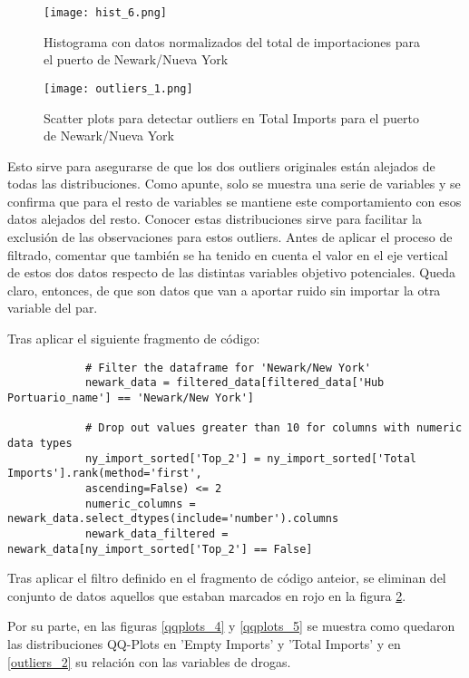 \documentclass[12pt]{article}
\begin{document}
		\begin{figure}[H]
			\caption{\label{hist_6} Histograma con datos normalizados del total de importaciones para el puerto de Newark/Nueva York}
			\centering
			\hspace*{1cm}
			\texttt{[image: hist\_6.png]}
		\end{figure}
		
		
		
		\begin{figure}[H]
			\caption{\label{outliers_1} Scatter plots para detectar outliers en Total Imports para el puerto de Newark/Nueva York}
			\centering
			\hspace*{1cm}
			\texttt{[image: outliers\_1.png]}
		\end{figure}
	
		Esto sirve para asegurarse de que los dos outliers originales están alejados de todas las distribuciones. Como apunte, solo se muestra una serie de variables y se confirma que para el resto de variables se mantiene este comportamiento con esos datos alejados del resto. Conocer estas distribuciones sirve para facilitar la exclusión de las observaciones para estos outliers. Antes de aplicar el proceso de filtrado, comentar que también se ha tenido en cuenta el valor en el eje vertical de estos dos datos respecto de las distintas variables objetivo potenciales. Queda claro, entonces, de que son datos que van a aportar ruido sin importar la otra variable del par.
		
		Tras aplicar el siguiente fragmento de código:
		
		\begin{verbatim}
			# Filter the dataframe for 'Newark/New York'
			newark_data = filtered_data[filtered_data['Hub Portuario_name'] == 'Newark/New York']
			
			# Drop out values greater than 10 for columns with numeric data types
			ny_import_sorted['Top_2'] = ny_import_sorted['Total Imports'].rank(method='first', 
			ascending=False) <= 2
			numeric_columns = newark_data.select_dtypes(include='number').columns
			newark_data_filtered = newark_data[ny_import_sorted['Top_2'] == False]
		\end{verbatim}
	
		Tras aplicar el filtro definido en el fragmento de código anteior, se eliminan del conjunto de datos aquellos que estaban marcados en rojo en la figura \ref{outliers_1}.
		
		Por su parte, en las figuras \ref{qqplots_4} y \ref{qqplots_5} se muestra como quedaron las distribuciones QQ-Plots en 'Empty Imports' y 'Total Imports' y en \ref{outliers_2} su relación con las variables de drogas.
		
\end{document}

